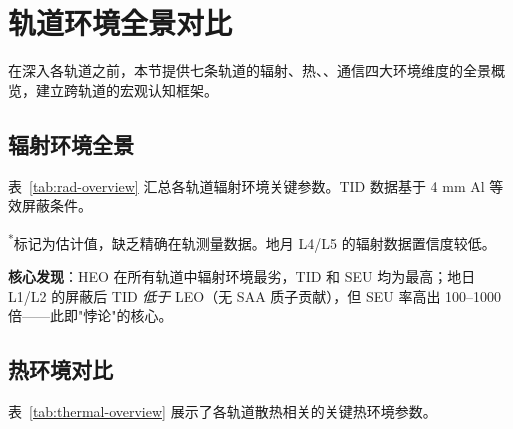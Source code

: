 
\section{轨道环境全景对比}

在深入各轨道之前，本节提供七条轨道的辐射、热、\deltav、通信四大环境维度的全景概览，建立跨轨道的宏观认知框架。

\subsection{辐射环境全景}

表~\ref{tab:rad-overview} 汇总各轨道辐射环境关键参数。TID 数据基于 4 mm Al 等效屏蔽条件。

\begin{table}[H]
\centering
\caption{各轨道辐射环境全景对比}
\label{tab:rad-overview}

\smallskip
\noindent\textsuperscript{*}标记为估计值，缺乏精确在轨测量数据。地月 L4/L5 的辐射数据置信度较低。
\end{table}

\textbf{核心发现}：HEO 在所有轨道中辐射环境最劣，TID 和 SEU 均为最高；地日 L1/L2 的屏蔽后 TID \textit{低于} LEO（无 SAA 质子贡献），但 SEU 率高出 100--1000 倍——此即"\tid 悖论"的核心。

\subsection{热环境对比}

表~\ref{tab:thermal-overview} 展示了各轨道散热相关的关键热环境参数。

